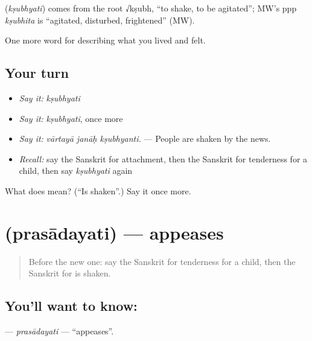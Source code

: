 \begin{cousinweb}
\textbf{} (\emph{kṣubhyati}) comes from the root √kṣubh, \textquotedblleft{}to shake, to be agitated\textquotedblright{}; MW's ppp \emph{kṣubhita} is \textquotedblleft{}agitated, disturbed, frightened\textquotedblright{} (MW).
\end{cousinweb}

\begin{grammarlens}[title={What you've built}]
One more word for describing what you lived and felt.
\end{grammarlens}

\subsection*{Your turn}
\begin{itemize}
\raggedright
  \item \emph{Say it:} \emph{kṣubhyati}
  \item \emph{Say it:} \emph{kṣubhyati}, once more
  \item \emph{Say it:} \emph{vārtayā janāḥ kṣubhyanti.} — People are shaken by the news.
  \item \emph{Recall:} say the Sanskrit for attachment, then the Sanskrit for tenderness for a child, then say \emph{kṣubhyati} again
\end{itemize}

\begin{tcolorbox}[breakable,colback=teal!4,colframe=teal!35!black,title={Before you move on}]
What does  mean? (\textquotedblleft{}Is shaken\textquotedblright{}.) Say it once more.
\end{tcolorbox}
\section[\texorpdfstring{\sk{प्रसादयति} (prasādayati)}{प्रसादयति (prasādayati)}]{ (prasādayati) — appeases}

\label{lesson:SA-C456-prasadayati}



\begin{quote}
Before the new one: say the Sanskrit for tenderness for a child, then the Sanskrit for is shaken.
\end{quote}

\subsection*{You'll want to know: }
\textbf{} — \emph{prasādayati} — \textquotedblleft{}appeases\textquotedblright{}.

